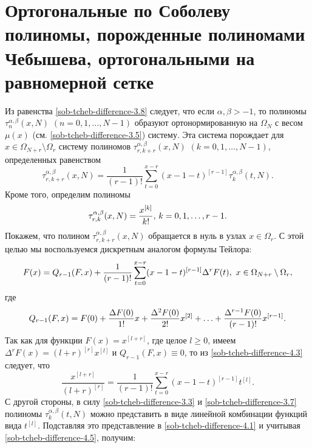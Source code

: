 \section{Ортогональные по Соболеву полиномы, порожденные полиномами Чебышева, ортогональными на равномерной сетке }
Из равенства \eqref{sob-tcheb-difference-3.8} следует, что если $\alpha,\beta>-1$, то полиномы $\tau_n^{\alpha,\beta}(x,N)$ $(n=0,1,\ldots, N-1)$
образуют ортонормированную на $\Omega_N$ с весом $\mu(x)$ (см. \eqref{sob-tcheb-difference-3.5}) систему.  Эта система порождает для $x \in \Omega_{N+r}\setminus\Omega_r$ систему полиномов $\tau_{r,k+r}^{\alpha,\beta}(x,N)$ $(k=0, 1,\ldots, N-1)$, определенных равенством
 \begin{equation}\label{sob-tcheb-difference-4.1}
\tau_{r,k+r}^{\alpha,\beta}(x,N)=\frac{1}{(r-1)!}
\sum\limits_{t=0}^{x-r}(x-1-t)^{[r-1]}\tau_{k}^{\alpha,\beta}(t,N).
\end{equation}
Кроме того, определим полиномы
 \begin{equation}\label{sob-tcheb-difference-4.2}
\tau_{r,k}^{\alpha,\beta}(x,N)={x^{[k]}\over k!},\, k=0,1,\ldots,r-1.
\end{equation}
Покажем, что полином $\tau_{r,k+r}^{\alpha,\beta}(x,N)$ обращается в нуль в узлах $x \in \Omega_r$.  С этой целью мы воспользуемся дискретным аналогом формулы Тейлора:
\begin{equation}\label{sob-tcheb-difference-4.3}
F(x)=Q_{r-1}(F,x) + {1\over(r-1)!}\sum_{t=0}^{x-r} (x-1-t)^{[r-1]}\Delta^rF(t),
\,\,
x \in \Omega_{N+r}\setminus\Omega_r,
\end{equation}
где
\begin{equation}\label{sob-tcheb-difference-4.4}
Q_{r-1}(F,x)= F(0)+{\Delta F(0)\over 1!}x+{\Delta^2 F(0)\over 2!}
x^{[2]}+\ldots+{\Delta^{r-1} F(0)\over (r-1)!}x^{[r-1]}.
\end{equation}
Так как для функции $F(x)=x^{[l+r]}$, где целое $l\ge0$, имеем $\Delta^{r}F(x)=(l+r)^{[r]}x^{[l]}$ и $Q_{r-1}(F,x)\equiv0$, то из \eqref{sob-tcheb-difference-4.3} следует, что
\begin{equation}\label{sob-tcheb-difference-4.5}
\frac{x^{[l+r]}}{(l+r)^{[r]}}=
\frac{1}{(r-1)!}\sum_{t=0}^{x-r} (x-1-t)^{[r-1]}t^{[l]}.
\end{equation}
С другой стороны, в силу \eqref{sob-tcheb-difference-3.3} и \eqref{sob-tcheb-difference-3.7} полиномы  $\tau_{k}^{\alpha,\beta}(t,N)$ можно представить в виде линейной комбинации функций вида $t^{[l]}$. Подставляя это представление в \eqref{sob-tcheb-difference-4.1} и учитывая \eqref{sob-tcheb-difference-4.5}, получим:
